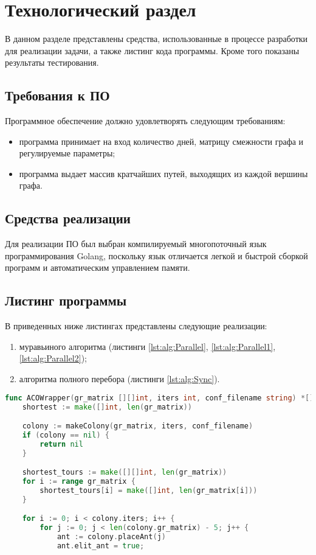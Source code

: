 \chapter{Технологический раздел}
\label{cha:technological}

    В данном разделе представлены средства, использованные в процессе разработки для реализации задачи, а также листинг кода программы. Кроме того показаны результаты тестирования.

    \section{Требования к ПО}
        Программное обеспечение должно удовлетворять следующим требованиям:
        \begin{itemize}
            \item программа принимает на вход количество дней, матрицу смежности графа и регулируемые параметры;
            \item программа выдает массив кратчайших путей, выходящих из каждой вершины графа.
        \end{itemize}
    \section{Средства реализации}
        Для реализации ПО был выбран компилируемый многопоточный язык программирования Golang, поскольку язык отличается легкой и быстрой сборкой программ и автоматическим управлением памяти.

    \section{Листинг программы}
        В приведенных ниже листингах представлены следующие реализации: 
        \begin{enumerate}
            \item муравьиного алгоритма (листинги \ref{lst:alg:Parallel}, \ref{lst:alg:Parallel1}, \ref{lst:alg:Parallel2});
            \item алгоритма полного перебора (листинги \ref{lst:alg:Sync}).
        \end{enumerate}
        \par \text{           }
        \begin{lstlisting}[language=Go, label=lst:alg:Parallel, caption=Реализация муравьиного алгоритма]
func ACOWrapper(gr_matrix [][]int, iters int, conf_filename string) *[]int {
    shortest := make([]int, len(gr_matrix))

    colony := makeColony(gr_matrix, iters, conf_filename)
    if (colony == nil) {
        return nil
    }

    shortest_tours := make([][]int, len(gr_matrix))
    for i := range gr_matrix {
        shortest_tours[i] = make([]int, len(gr_matrix[i]))
    }

    for i := 0; i < colony.iters; i++ {
        for j := 0; j < len(colony.gr_matrix) - 5; j++ {
            ant := colony.placeAnt(j)
            ant.elit_ant = true;
\end{lstlisting}

